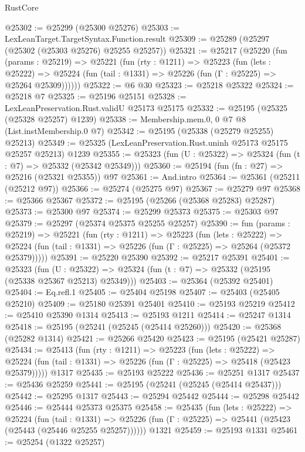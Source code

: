 \begin{lexlean}{RustCore}
\begin{coremodule}
@25302 := @25299 (@25300 @25276)
@25303 := LexLeanTarget.TargetSyntax.Function.result
@25309 := @25289 (@25297 (@25302 (@25303 @25276) @25255 @25257))
@25321 := @25217
    (@25220
      (fun (params : @25219) =>
      @25221
        (fun (rty : @1211) =>
        @25223
          (fun (lets : @25222) =>
          @25224 (fun (tail : @1331) => @25226 (fun (Γ : @25225) => @25264 @25309))))))
@25322 := @6 @30
@25323 := @25218 @25322
@25324 := @25218 @7
@25325 := @25196 @25151
@25328 := LexLeanPreservation.Rust.validU @25173 @25175
@25332 := @25195 (@25325 (@25328 @25257) @1239)
@25338 := Membership.mem.{0, 0} @7 @8 (List.instMembership.{0} @7)
@25342 := @25195 (@25338 (@25279 @25255) @25213)
@25349 := @25325 (LexLeanPreservation.Rust.uninh @25173 @25175 @25257 @25213) @1239
@25355 := @25323 (fun (U : @25322) => @25324 (fun (t : @7) => @25332 (@25342 @25349)))
@25360 := @25194 (fun (fn : @27) => @25216 (@25321 @25355)) @97
@25361 := And.intro
@25364 := @25361 (@25211 (@25212 @97))
@25366 := @25274 (@25275 @97)
@25367 := @25279 @97
@25368 := @25366 @25367
@25372 := @25195 (@25266 (@25368 @25283) @25287)
@25373 := @25300 @97
@25374 := @25299 @25373
@25375 := @25303 @97
@25379 := @25297 (@25374 @25375 @25255 @25257)
@25390 := fun (params : @25219) =>
  @25221
    (fun (rty : @1211) =>
    @25223
      (fun (lets : @25222) =>
      @25224 (fun (tail : @1331) => @25226 (fun (Γ : @25225) => @25264 (@25372 @25379)))))
@25391 := @25220 @25390
@25392 := @25217 @25391
@25401 := @25323
    (fun (U : @25322) => @25324 (fun (t : @7) => @25332 (@25195 (@25338 @25367 @25213) @25349)))
@25403 := @25364 (@25392 @25401)
@25404 := Eq.refl.{1}
@25405 := @25404 @25198
@25407 := @25403 (@25405 @25210)
@25409 := @25180 @25391 @25401
@25410 := @25193 @25219
@25412 := @25410 @25390 @1314
@25413 := @25193 @1211
@25414 := @25247 @1314
@25418 := @25195 (@25241 (@25245 (@25414 @25260)))
@25420 := @25368 (@25282 @1314)
@25421 := @25266 @25420
@25423 := @25195 (@25421 @25287)
@25434 := @25413
    (fun (rty : @1211) =>
    @25223
      (fun (lets : @25222) =>
      @25224 (fun (tail : @1331) => @25226 (fun (Γ : @25225) => @25418 (@25423 @25379)))))
    @1317
@25435 := @25193 @25222
@25436 := @25251 @1317
@25437 := @25436 @25259
@25441 := @25195 (@25241 (@25245 (@25414 @25437)))
@25442 := @25295 @1317
@25443 := @25294 @25442
@25444 := @25298 @25442
@25446 := @25444 @25373 @25375
@25458 := @25435
    (fun (lets : @25222) =>
    @25224
      (fun (tail : @1331) =>
      @25226 (fun (Γ : @25225) => @25441 (@25423 (@25443 (@25446 @25255 @25257))))))
    @1321
@25459 := @25193 @1331
@25461 := @25254 (@1322 @25257)

\end{coremodule}
\end{lexlean}
